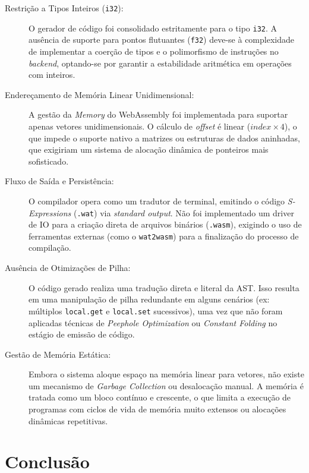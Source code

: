 \documentclass[12pt,a4paper]{article}
\begin{document}
\begin{description}
    \item[Restrição a Tipos Inteiros (\texttt{i32}):] O gerador de código foi consolidado estritamente para o tipo \texttt{i32}. A ausência de suporte para pontos flutuantes (\texttt{f32}) deve-se à complexidade de implementar a coerção de tipos e o polimorfismo de instruções no \textit{backend}, optando-se por garantir a estabilidade aritmética em operações com inteiros.
    
    \item[Endereçamento de Memória Linear Unidimensional:] A gestão da \textit{Memory} do WebAssembly foi implementada para suportar apenas vetores unidimensionais. O cálculo de \textit{offset} é linear ($index \times 4$), o que impede o suporte nativo a matrizes ou estruturas de dados aninhadas, que exigiriam um sistema de alocação dinâmica de ponteiros mais sofisticado.
    
    \item[Fluxo de Saída e Persistência:] O compilador opera como um tradutor de terminal, emitindo o código \textit{S-Expressions} (\texttt{.wat}) via \textit{standard output}. Não foi implementado um driver de IO para a criação direta de arquivos binários (\texttt{.wasm}), exigindo o uso de ferramentas externas (como o \texttt{wat2wasm}) para a finalização do processo de compilação.
    
    \item[Ausência de Otimizações de Pilha:] O código gerado realiza uma tradução direta e literal da AST. Isso resulta em uma manipulação de pilha redundante em alguns cenários (ex: múltiplos \texttt{local.get} e \texttt{local.set} sucessivos), uma vez que não foram aplicadas técnicas de \textit{Peephole Optimization} ou \textit{Constant Folding} no estágio de emissão de código.
    
    \item[Gestão de Memória Estática:] Embora o sistema aloque espaço na memória linear para vetores, não existe um mecanismo de \textit{Garbage Collection} ou desalocação manual. A memória é tratada como um bloco contínuo e crescente, o que limita a execução de programas com ciclos de vida de memória muito extensos ou alocações dinâmicas repetitivas.
\end{description}

\section{Conclusão}
\end{document}
